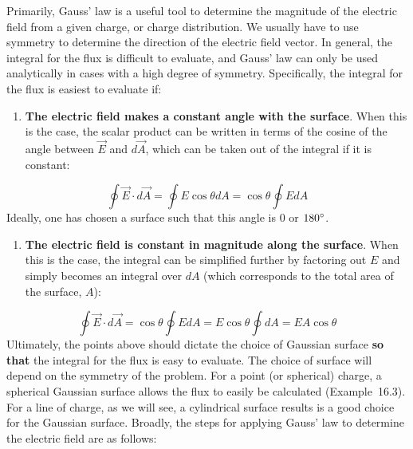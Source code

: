 Primarily, Gauss' law is a useful tool to determine the magnitude of the electric field from a given charge, or charge distribution. We usually have to use symmetry to determine the direction of the electric field vector. In general, the integral for the flux is difficult to evaluate, and Gauss' law can only be used analytically in cases with a high degree of symmetry. Specifically, the integral for the flux is easiest to evaluate if:

\begin{enumerate}
\item \textbf{The electric field makes a constant angle with the surface}. When this is the case, the scalar product can be written in terms of the cosine of the angle between $\vec E$ and $d\vec A$, which can be taken out of the integral if it is constant:
\end{enumerate}
\begin{equation}
\oint \vec E\cdot d\vec A=\oint E\cos\theta dA=\cos\theta\oint EdA
\end{equation}
Ideally, one has chosen a surface such that this angle is 0 or $180\degree$.

\begin{enumerate}[resume]
\item \textbf{The electric field is constant in magnitude along the surface}. When this is the case, the integral can be simplified further by factoring out $E$ and simply becomes an integral over $dA$ (which corresponds to the total area of the surface, $A$):
\end{enumerate}
\begin{equation}
\oint \vec E\cdot d\vec A=\cos\theta\oint EdA =E\cos\theta\oint dA=EA\cos\theta
\end{equation}
Ultimately, the points above should dictate the choice of Gaussian surface \textbf{so that} the integral for the flux is easy to evaluate. The choice of surface will depend on the symmetry of the problem. For a point (or spherical) charge, a spherical Gaussian surface allows the flux to easily be calculated (Example~16.3). For a line of charge, as we will see, a cylindrical surface results is a good choice for the Gaussian surface. Broadly, the steps for applying Gauss' law to determine the electric field are as follows:

